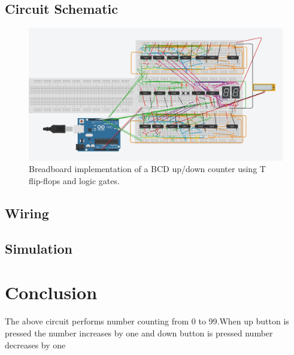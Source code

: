 \documentclass{article}
\begin{document}
    \subsection{Circuit Schematic}
    \begin{figure}[h!]
        \centering
        \includegraphics[width=\textwidth]{counter_circuit.jpeg}
        \caption{Breadboard implementation of a BCD up/down counter using T flip-flops and logic gates.}
        \label{fig:bcd_counter}
    \end{figure}
    \subsection{Wiring}
    
    \subsection{Simulation}
    \section{Conclusion}
    The above circuit performs number counting from 0 to 99.When up button is pressed the number increases by one and down button is pressed number decreases by one
    
\end{document}
